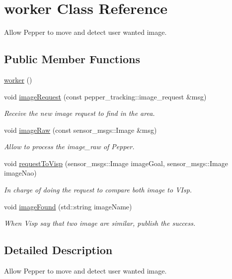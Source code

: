\hypertarget{classworker}{}\section{worker Class Reference}
\label{classworker}


Allow Pepper to move and detect user wanted image.  


\subsection*{Public Member Functions}
\begin{DoxyCompactItemize}
\item 
\hyperlink{classworker_a7bd845810dd8185384e37405ef322b7d}{worker} ()
\item 
void \hyperlink{classworker_a8f0d3d3cbd7418830cd77a0bba55465b}{image\+Request} (const pepper\+\_\+tracking\+::image\+\_\+request \&msg)
\begin{DoxyCompactList}\small\item\em Receive the new image request to find in the area. \end{DoxyCompactList}\item 
void \hyperlink{classworker_a24193ed917b818ef20de0240499468fc}{image\+Raw} (const sensor\+\_\+msgs\+::\+Image \&msg)
\begin{DoxyCompactList}\small\item\em Allow to process the image\+\_\+raw of Pepper. \end{DoxyCompactList}\item 
void \hyperlink{classworker_a2accc661aa0de65223603bfff5f69b27}{request\+To\+Visp} (sensor\+\_\+msgs\+::\+Image image\+Goal, sensor\+\_\+msgs\+::\+Image image\+Nao)
\begin{DoxyCompactList}\small\item\em In charge of doing the request to compare both image to V\+Isp. \end{DoxyCompactList}\item 
void \hyperlink{classworker_a27863e3e984867effbc8accfb0d034f8}{image\+Found} (std\+::string image\+Name)
\begin{DoxyCompactList}\small\item\em When Visp say that two image are similar, publish the success. \end{DoxyCompactList}\end{DoxyCompactItemize}


\subsection{Detailed Description}
Allow Pepper to move and detect user wanted image. 

